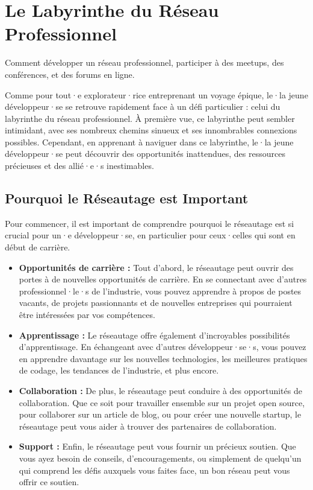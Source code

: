
\chapter{Le Labyrinthe du Réseau Professionnel}

Comment développer un réseau professionnel, participer à des meetups, des conférences, et des forums en ligne.

Comme pour tout·e explorateur·rice entreprenant un voyage épique, le·la jeune développeur·se se retrouve rapidement face à un défi particulier : celui du labyrinthe du réseau professionnel. À première vue, ce labyrinthe peut sembler intimidant, avec ses nombreux chemins sinueux et ses innombrables connexions possibles. Cependant, en apprenant à naviguer dans ce labyrinthe, le·la jeune développeur·se peut découvrir des opportunités inattendues, des ressources précieuses et des allié·e·s inestimables.

\section{Pourquoi le Réseautage est Important}

Pour commencer, il est important de comprendre pourquoi le réseautage est si crucial pour un·e développeur·se, en particulier pour ceux·celles qui sont en début de carrière.

\begin{itemize}
    \item \textbf{Opportunités de carrière :} Tout d'abord, le réseautage peut ouvrir des portes à de nouvelles opportunités de carrière. En se connectant avec d'autres professionnel·le·s de l'industrie, vous pouvez apprendre à propos de postes vacants, de projets passionnants et de nouvelles entreprises qui pourraient être intéressées par vos compétences.

    \item \textbf{Apprentissage :} Le réseautage offre également d'incroyables possibilités d'apprentissage. En échangeant avec d'autres développeur·se·s, vous pouvez en apprendre davantage sur les nouvelles technologies, les meilleures pratiques de codage, les tendances de l'industrie, et plus encore.

    \item \textbf{Collaboration :} De plus, le réseautage peut conduire à des opportunités de collaboration. Que ce soit pour travailler ensemble sur un projet open source, pour collaborer sur un article de blog, ou pour créer une nouvelle startup, le réseautage peut vous aider à trouver des partenaires de collaboration.

    \item \textbf{Support :} Enfin, le réseautage peut vous fournir un précieux soutien. Que vous ayez besoin de conseils, d'encouragements, ou simplement de quelqu'un qui comprend les défis auxquels vous faites face, un bon réseau peut vous offrir ce soutien.
\end{itemize}

